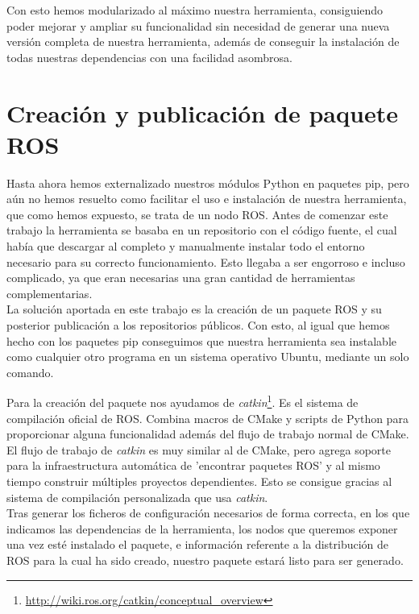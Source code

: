 Con esto hemos modularizado al máximo nuestra herramienta, consiguiendo poder mejorar y ampliar su funcionalidad sin necesidad de generar una nueva versión completa de nuestra herramienta, además de conseguir la instalación de todas nuestras dependencias con una facilidad asombrosa.
\section{Creación y publicación de paquete ROS}
\label{sec:paquete-ros}
Hasta ahora hemos externalizado nuestros módulos Python en paquetes pip, pero aún no hemos resuelto como facilitar el uso e instalación de nuestra herramienta, que como hemos expuesto, se trata de un nodo ROS. Antes de comenzar este trabajo la herramienta se basaba en un repositorio con el código fuente, el cual había que descargar al completo y manualmente instalar todo el entorno necesario para su correcto funcionamiento. Esto llegaba a ser engorroso e incluso complicado, ya que eran necesarias una gran cantidad de herramientas complementarias.\\

La solución aportada en este trabajo es la creación de un paquete ROS y su posterior publicación a los repositorios públicos. Con esto, al igual que hemos hecho con los paquetes pip conseguimos que nuestra herramienta sea instalable como cualquier otro programa en un sistema operativo Ubuntu, mediante un solo comando. 

Para la creación del paquete nos ayudamos de \textit{catkin}\footnote{\url{http://wiki.ros.org/catkin/conceptual_overview}}. Es el sistema de compilación oficial de ROS. Combina macros de CMake y scripts de Python para proporcionar alguna funcionalidad además del flujo de trabajo normal de CMake. El flujo de trabajo de \textit{catkin} es muy similar al de CMake, pero agrega soporte para la infraestructura automática de 'encontrar paquetes ROS' y al mismo tiempo construir múltiples proyectos dependientes. Esto se consigue gracias al sistema de compilación personalizada que usa \textit{catkin}.\\

Tras generar los ficheros de configuración necesarios de forma correcta, en los que indicamos las dependencias de la herramienta, los nodos que queremos exponer una vez esté instalado el paquete, e información referente a la distribución de ROS para la cual ha sido creado, nuestro paquete estará listo para ser generado.\\

